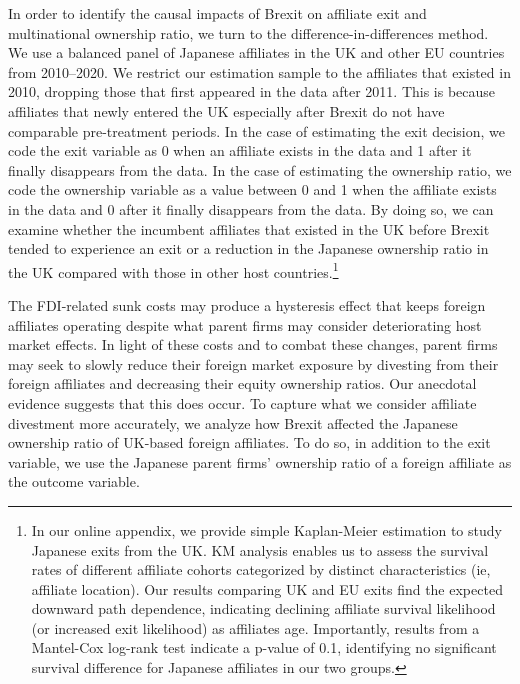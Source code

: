 \documentclass[preprint,11pt,authoryear]{elsarticle}
\begin{document}
In order to identify the causal impacts of Brexit on affiliate exit and multinational ownership ratio, we turn to the difference-in-differences method. We use a balanced panel of Japanese affiliates in the UK and other EU countries from 2010--2020. We restrict our estimation sample to the affiliates that existed in 2010, dropping those that first appeared in the data after 2011. This is because affiliates that newly entered the UK especially after Brexit do not have comparable pre-treatment periods. In the case of estimating the exit decision, we code the exit variable as 0 when an affiliate exists in the data and 1 after it finally disappears from the data. In the case of estimating the ownership ratio, we code the ownership variable as a value between 0 and 1 when the affiliate exists in the data and 0 after it finally disappears from the data. By doing so, we can examine whether the incumbent affiliates that existed in the UK before Brexit tended to experience an exit or a reduction in the Japanese ownership ratio in the UK compared with those in other host countries.\footnote{In our online appendix, we provide simple Kaplan-Meier estimation to study Japanese exits from the UK. KM analysis enables us to assess the survival rates of different affiliate cohorts categorized by distinct characteristics (ie, affiliate location). Our results comparing UK and EU exits find the expected downward path dependence, indicating declining affiliate survival likelihood (or increased exit likelihood) as affiliates age. Importantly, results from a Mantel-Cox log-rank test indicate a p-value of 0.1, identifying no significant survival difference for Japanese affiliates in our two groups.}

The FDI-related sunk costs may produce a hysteresis effect that keeps foreign affiliates operating despite what parent firms may consider deteriorating host market effects. In light of these costs and to combat these changes, parent firms may seek to slowly reduce their foreign market exposure by divesting from their foreign affiliates and decreasing their equity ownership ratios. Our anecdotal evidence suggests that this does occur. To capture what we consider affiliate divestment more accurately, we analyze how Brexit affected the Japanese ownership ratio of UK-based foreign affiliates.
To do so, in addition to the exit variable, we use the Japanese parent firms' ownership ratio of a foreign affiliate as the outcome variable. 
\end{document}
